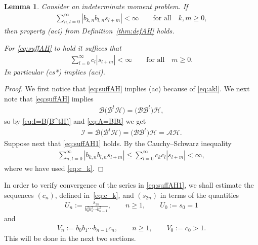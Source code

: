 \documentclass[11pt]{article}
\numberwithin{equation}{section}
\newtheorem{lem}[thm]{Lemma}
\begin{document}
\begin{lem}\label{thm:suffAH} Consider an indeterminate moment problem. If
\begin{gather}\label{eq:suffAH}
\sum_{n,l=0}^\infty |b_{k,n}b_{l,n}s_{l+m}|<\infty\qquad \mbox{for all}\quad k,m\ge 0,
\end{gather}
then property {\rm (aci)} from Definition~{\rm \ref{thm:defAH}} holds.

For \eqref{eq:suffAH} to hold it suffices that
\begin{gather}\label{eq:suffAH1}
\sum_{l=0}^\infty c_l |s_{l+m}|<\infty\qquad\mbox{for all}\quad m\ge 0.
\end{gather}
In particular {\rm (cs*)} implies {\rm (aci)}.
\end{lem}

\begin{proof} We first notice that \eqref{eq:suffAH} implies (ac) because of \eqref{eq:akl}. We next note that \eqref{eq:suffAH} implies
\begin{gather*}
\mathcal B\big(\mathcal B^t\mathcal H\big)=\big(\mathcal B\mathcal B^t\big)\mathcal H,
\end{gather*}
so by \eqref{eq:I=B(B^tH)} and \eqref{eq:A=BBt} we get
\begin{gather*}
\mathcal I=\mathcal B\big(\mathcal B^t\mathcal H\big)=\big(\mathcal B\mathcal B^t\big)\mathcal H=\mathcal A\mathcal H.
\end{gather*}
Suppose next that \eqref{eq:suffAH1} holds. By the Cauchy--Schwarz inequality
\begin{gather*}
\sum_{n,l=0}^\infty |b_{k,n}b_{l,n}s_{l+m}|\le \sum_{l=0}^\infty c_kc_l|s_{l+m}|<\infty,
\end{gather*}
where we have used \eqref{eq:c_k}.
\end{proof}

\setcounter{section}{2}
\setcounter{subsection}{0}
\setcounter{subsubsection}{0}
\setcounter{thm}{5}
\setcounter{equation}{10}
In order to verify convergence of the series in \eqref{eq:suffAH1}, we shall estimate the sequences $(c_n)$, defined in~\eqref{eq:c_k}, and $(s_{2n})$ in terms of the quantities
\begin{gather}\label{eq:Un}
U_n:=\frac{s_{2n}}{b_0^2b_1^2\cdots b_{n-1}^2},\qquad n\ge 1,\qquad U_0:=s_0=1
\end{gather}
and
\begin{gather}\label{eq:Vn}
V_n:=b_0 b_1\cdots b_{n-1}c_n,\qquad n\ge 1,\qquad V_0:=c_0>1.
\end{gather}
This will be done in the next two sections.
\end{document}
